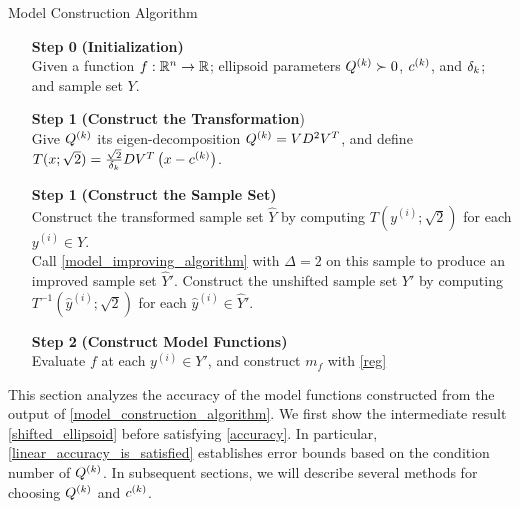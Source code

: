 \documentclass{article}
\begin{document}
{
\begin{fullwidth}[leftmargin=0in, rightmargin=0in, width=\linewidth-0.5in]
\begin{flushleft}

\begin{algorithm}[H]
    \caption{Model Construction Algorithm}
    \label{model_construction_algorithm}
    \begin{itemize}
        \item[\textbf{Step 0}] \textbf{(Initialization)} \\
			Given a function $f : \mathbb R^n \to \mathbb R$;
			ellipsoid parameters ${Q^{(k)}} \succ 0$, $c^{(k)}$, and $\delta_k$;
        	and sample set $Y$.
        \item[\textbf{Step 1}] \textbf{(Construct the Transformation}) \\
        	Give ${Q^{(k)}}$ its eigen-decomposition ${Q^{(k)}} = VD^2V^T$, and define
			$T(x; \sqrt{2}) = \frac{\sqrt{2}}{\delta_k} D V^T\left(x - c^{(k)}\right)$.
        \item[\textbf{Step 1}] \textbf{(Construct the Sample Set)} \\
        Construct the transformed sample set $\hat Y$ by computing $T\left(y^{(i)}; \sqrt{2}\right)$ for each $y^{(i)} \in Y$. \\
        Call \cref{model_improving_algorithm} with $\Delta = 2$ on this sample to produce an improved sample set $\hat Y '$.
        Construct the unshifted sample set $Y'$ by computing $T^{-1}\left(\hat y^{(i)}; \sqrt{2}\right)$ for each $\hat y^{(i)} \in \hat Y'$.
        \item[\textbf{Step 2}] \textbf{(Construct Model Functions)} \\
        Evaluate $f$ at each $y^{(i)} \in Y'$, and construct $m_f$ with \cref{reg}
    \end{itemize}
\end{algorithm}


\end{flushleft}
\end{fullwidth}
}

This section analyzes the accuracy of the model functions constructed from the output of \cref{model_construction_algorithm}.
We first show the intermediate result
\cref{shifted_ellipsoid}
before satisfying \cref{accuracy}.
In particular, \cref{linear_accuracy_is_satisfied} establishes error bounds based on the condition number of ${Q^{(k)}}$.
In subsequent sections, we will describe several methods for choosing ${Q^{(k)}}$ and $c^{(k)}$.
\end{document}
